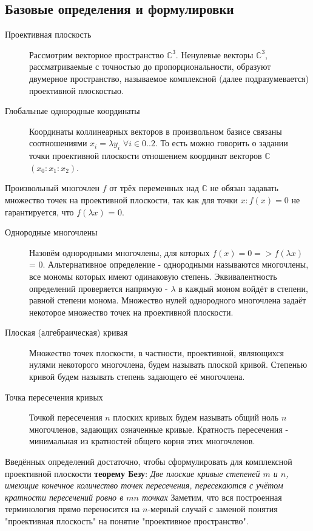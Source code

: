 \documentclass[a4paper, 12pt]{article}
\begin{document}
\subsection{Базовые определения и формулировки}
\begin{description}
\item[Проективная плоскость]
Рассмотрим векторное пространство $\mathbb{C}^3$. Ненулевые векторы $\mathbb{C}^3$, рассматриваемые с точностью до пропорциональности, образуют двумерное пространство, называемое комплексной (далее подразумевается) проективной плоскостью.
\item[Глобальные однородные координаты]
Координаты коллинеарных векторов в произвольном базисе связаны соотношениями $x_i = \lambda y_i$ $\forall i \in {0..2}$. То есть можно говорить о задании точки проективной плоскости отношением координат векторов $\mathbb{C}$ $(x_0:x_1:x_2)$.\newline
\end{description}
\bigskip
Произвольный многочлен $f$ от трёх переменных над $\mathbb{C}$ не обязан задавать множество точек на проективной плоскости, так как для точки $x: f(x) = 0$ не гарантируется, что $f(\lambda x)$ = 0.
\begin{description}
\item[Однородные многочлены] Назовём однородными многочлены, для которых $f(x) = 0 => f(\lambda x)$ = 0. Альтернативное определение - однородными называются многочлены, все мономы которых имеют одинаковую степень. Эквивалентность определений проверяется напрямую - $\lambda$ в каждый моном войдёт в степени, равной степени монома. Множество нулей однородного многочлена задаёт некоторое множество точек на проективной плоскости.
\item[Плоская (алгебраическая) кривая]
Множество точек плоскости, в частности, проективной, являющихся нулями некоторого многочлена, будем называть плоской кривой. Степенью кривой будем называть степень задающего её многочлена.
\item[Точка пересечения кривых]
Точкой пересечения $n$ плоских кривых будем называть общий ноль $n$ многочленов, задающих означенные кривые. Кратность пересечения - минимальная из кратностей общего корня этих многочленов.
\end{description}
Введённых определений достаточно, чтобы сформулировать для комплексной проективной плоскости \textbf{теорему Безу}:
\textit{Две плоские кривые степеней $m$ и $n$, имеющие конечное количество точек пересечения, пересекаются с учётом кратности пересечений ровно в $mn$ точках}\newline
Заметим, что вся построенная терминология прямо переносится на $n$-мерный случай с заменой понятия "проективная плоскость" на понятие "проективное пространство".
\end{document}
